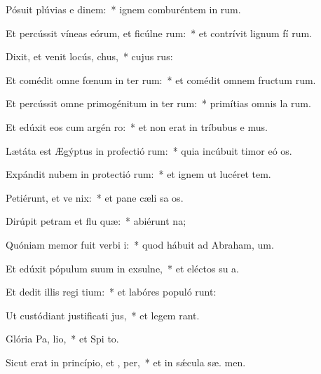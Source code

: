 \item Pósuit plúvias e dinem:~* ignem comburéntem in  rum.
\item Et percússit víneas eórum, et ficúlne rum:~* et contrívit lignum fí rum.
\item Dixit, et venit locús,  chus,~* cujus   rus:
\item Et comédit omne fœnum in ter rum:~* et comédit omnem fructum  rum.
\item Et percússit omne primogénitum in ter rum:~* primítias omnis la rum.
\item Et edúxit eos cum argén  ro:~* et non erat in tríbubus e mus.
\item Lætáta est Ægýptus in profectió rum:~* quia incúbuit timor eó  os.
\item Expándit nubem in protectió rum:~* et ignem ut lucéret   tem.
\item Petiérunt, et ve nix:~* et pane cæli sa os.
\item Dirúpit petram et flu quæ:~* abiérunt   na;
\item Quóniam memor fuit verbi  i:~* quod hábuit ad Abraham,  um.
\item Et edúxit pópulum suum in exsulne,~* et eléctos su  a.
\item Et dedit illis regi tium:~* et labóres populó runt:
\item Ut custódiant justificati jus,~* et legem  rant.
\item Glória Pa,  lio,~* et Spi to.
\item Sicut erat in princípio, et ,  per,~* et in sǽcula sæ. men.
